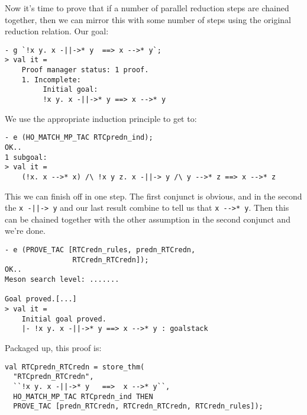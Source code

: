 Now it's time to prove that if a number of parallel reduction steps
are chained together, then we can mirror this with some number of
steps using the original reduction relation.  Our goal:
\begin{session}\begin{verbatim}
- g `!x y. x -||->* y  ==> x -->* y`;
> val it =
    Proof manager status: 1 proof.
    1. Incomplete:
         Initial goal:
         !x y. x -||->* y ==> x -->* y
\end{verbatim}\end{session}
We use the appropriate induction principle to get to:
\begin{session}\begin{verbatim}
- e (HO_MATCH_MP_TAC RTCpredn_ind);
OK..
1 subgoal:
> val it =
    (!x. x -->* x) /\ !x y z. x -||-> y /\ y -->* z ==> x -->* z
\end{verbatim}\end{session}
This we can finish off in one step.  The first conjunct is obvious,
and in the second the \verb!x -||-> y! and our last result combine to
tell us that \verb!x -->* y!.  Then this can be chained together with
the other assumption in the second conjunct and we're done.
\begin{session}\begin{verbatim}
- e (PROVE_TAC [RTCredn_rules, predn_RTCredn,
                RTCredn_RTCredn]);
OK..
Meson search level: .......

Goal proved.[...]
> val it =
    Initial goal proved.
    |- !x y. x -||->* y ==> x -->* y : goalstack
\end{verbatim}\end{session}
Packaged up, this proof is:
\begin{session}\begin{verbatim}
val RTCpredn_RTCredn = store_thm(
  "RTCpredn_RTCredn",
  ``!x y. x -||->* y   ==>  x -->* y``,
  HO_MATCH_MP_TAC RTCpredn_ind THEN
  PROVE_TAC [predn_RTCredn, RTCredn_RTCredn, RTCredn_rules]);
\end{verbatim}\end{session}
\eos{}


